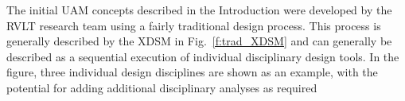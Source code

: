 




The initial UAM concepts described in the Introduction were developed by the RVLT research team using a fairly traditional design process.
This process is generally described by the XDSM in Fig.~\ref{f:trad_XDSM} and can generally be described as a sequential execution of individual disciplinary design tools.
In the figure, three individual design disciplines are shown as an example, with the potential for adding additional disciplinary analyses as required

